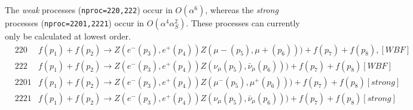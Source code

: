 The {\it weak} processes ({\tt nproc=220,222}) occur in $O(\alpha^6)$, 
whereas the {\it strong} processes ({\tt nproc=2201,2221}) occur in $O(\alpha^4 \alpha_S^2)$.
These processes can currently only be calculated at lowest order.
\begin{eqnarray}
&220 &  f(p_1)+f(p_2) \to  Z(e^-(p_3),e^+(p_4))Z(\mu-(p_5),\mu+(p_6)))+f(p_7)+f(p_8), [WBF]  \nonumber \\
&222 &  f(p_1)+f(p_2) \to Z(e^-(p_3),e^+(p_4))Z(\nu_\mu(p_5),\bar{\nu}_\mu(p_6)))+f(p_7)+f(p_8) [WBF]  \nonumber \\
&2201 & f(p_1)+f(p_2) \to Z(e^-(p_3),e^+(p_4))Z(\mu^-(p_5),\mu^+(p_6)))+f(p_7)+f(p_8) [strong] \nonumber \\
&2221 & f(p_1)+f(p_2) \to Z(e^-(p_3),e^+(p_4))Z(\nu_\mu(p_5),\bar{\nu}_\mu(p_6)))+f(p_7)+f(p_8) [strong]  \nonumber
\end{eqnarray}

